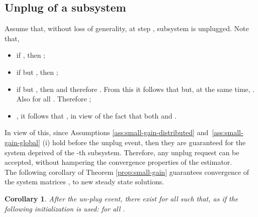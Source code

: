 \documentclass[journal,10pt,draftcls,onecolumn]{IEEEtran}
\newtheorem{corollary}{Corollary}
\begin{document}
\subsection{Unplug of a subsystem}
\label{sec:unplug}
Assume that, without loss of generality, at step , subsystem  is unplugged. Note that,
\begin{itemize}
\item if , then ;
\item if  but , then ;
\item if  but , then
 and therefore . From this it follows that  but, at the same time, . Also  for all . Therefore
;
\item , it follows that , in view of the fact that both  and .
\end{itemize}
In view of this, since Assumptions \ref{ass:small-gain-distributed} and~\ref{ass:small-gain-global} (i) hold before the unplug event, then they are guaranteed for the system deprived of the -th subsystem. Therefore, any unplug request can be accepted, without hampering the convergence properties of the estimator.\\
The following corollary of Theorem \ref{prop:small-gain} guarantees convergence of the system matrices ,  to new steady state solutions.
\begin{corollary}
\label{cor:small-gain-unPlug}
After the un-plug event, there exist  for all  such that,  as  if the following initialization is used:  for all .
\end{corollary}
\end{document}
